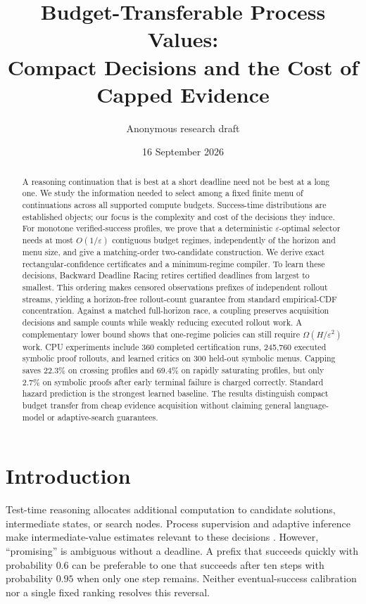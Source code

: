 \documentclass[11pt]{article}
\title{Budget-Transferable Process Values:\\Compact Decisions and the Cost of Capped Evidence}
\author{Anonymous research draft}
\date{16 September 2026}
\theoremstyle{definition}\newtheorem{definition}[theorem]{Definition}
\newcommand{\eps}{\varepsilon}
\begin{document}
\maketitle
\begin{abstract}
A reasoning continuation that is best at a short deadline need not be best at a long one. We study the information needed to select among a fixed finite menu of continuations across all supported compute budgets. Success-time distributions are established objects; our focus is the complexity and cost of the decisions they induce. For monotone verified-success profiles, we prove that a deterministic $\eps$-optimal selector needs at most $O(1/\eps)$ contiguous budget regimes, independently of the horizon and menu size, and give a matching-order two-candidate construction. We derive exact rectangular-confidence certificates and a minimum-regime compiler. To learn these decisions, Backward Deadline Racing retires certified deadlines from largest to smallest. This ordering makes censored observations prefixes of independent rollout streams, yielding a horizon-free rollout-count guarantee from standard empirical-CDF concentration. Against a matched full-horizon race, a coupling preserves acquisition decisions and sample counts while weakly reducing executed rollout work. A complementary lower bound shows that one-regime policies can still require $\Omega(H/\eps^2)$ work. CPU experiments include 360 completed certification runs, 245,760 executed symbolic proof rollouts, and learned critics on 300 held-out symbolic menus. Capping saves 22.3\% on crossing profiles and 69.4\% on rapidly saturating profiles, but only 2.7\% on symbolic proofs after early terminal failure is charged correctly. Standard hazard prediction is the strongest learned baseline. The results distinguish compact budget transfer from cheap evidence acquisition without claiming general language-model or adaptive-search guarantees.
\end{abstract}

\section{Introduction}
Test-time reasoning allocates additional computation to candidate solutions, intermediate states, or search nodes. Process supervision and adaptive inference make intermediate-value estimates relevant to these decisions \citep{lightman2023,snell2024,li2026budget}. However, ``promising'' is ambiguous without a deadline. A prefix that succeeds quickly with probability $0.6$ can be preferable to one that succeeds after ten steps with probability $0.95$ when only one step remains. Neither eventual-success calibration nor a single fixed ranking resolves this reversal.
\end{document}
